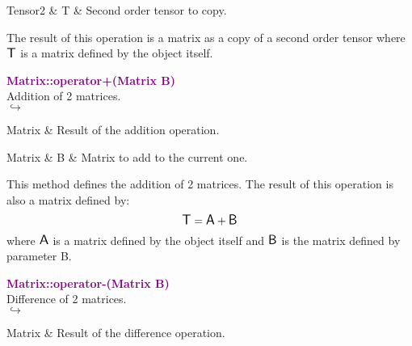 \begin{tcolorbox}[width=\textwidth,myArgs,tabularx={ll|R}]
Tensor2 & T & Second order tensor to copy.
\end{tcolorbox}

The result of this operation is a matrix as a copy of a second order tensor where $\mbox{\large\ensuremath{\mathsf{T}}}$ is a matrix defined by the object itself.

\textcolor{purple}{\textbf{Matrix::operator+(Matrix B)}}\label{Matrix::operator+(Matrix B)}\\
Addition of 2 matrices.\\ \hspace*{5mm}$\hookrightarrow$
\vspace*{-2em}\begin{tcolorbox}[grow to left by=-1cm, width=\textwidth-1cm,myArgs,tabularx={l|R}]
Matrix & Result of the addition operation.
\end{tcolorbox}

\begin{tcolorbox}[width=\textwidth,myArgs,tabularx={ll|R}]
Matrix & B & Matrix to add to the current one.
\end{tcolorbox}

This method defines the addition of 2 matrices.
The result of this operation is also a matrix defined by:
\begin{equation*}
\mbox{\large\ensuremath{\mathsf{T}}} = \mbox{\large\ensuremath{\mathsf{A}}} + \mbox{\large\ensuremath{\mathsf{B}}}
\end{equation*}
where $\mbox{\large\ensuremath{\mathsf{A}}}$ is a matrix defined by the object itself and $\mbox{\large\ensuremath{\mathsf{B}}}$ is the matrix defined by parameter B.

\textcolor{purple}{\textbf{Matrix::operator-(Matrix B)}}\label{Matrix::operator-(Matrix B)}\\
Difference of 2 matrices.\\ \hspace*{5mm}$\hookrightarrow$
\vspace*{-2em}\begin{tcolorbox}[grow to left by=-1cm, width=\textwidth-1cm,myArgs,tabularx={l|R}]
Matrix & Result of the difference operation.
\end{tcolorbox}

